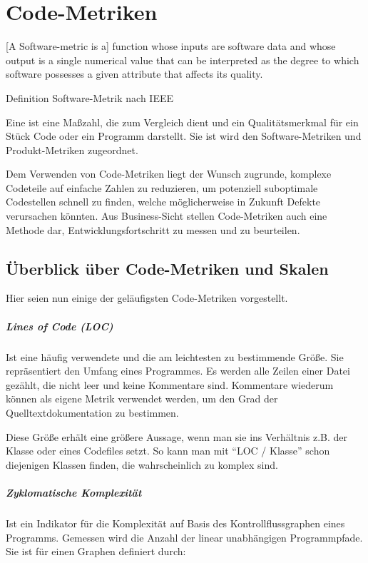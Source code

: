 \chapter{Code-Metriken}
\label{sec:metriken}
\epigraph{[A Software-metric is a] function whose inputs are software data and whose output is a single
numerical value that can be interpreted as the degree to which software possesses a given attribute that affects its quality.}{Definition Software-Metrik nach IEEE \citep{ieee_1998}}

Eine  ist eine Maßzahl, die zum Vergleich dient und ein Qualitätsmerkmal für ein Stück Code oder ein Programm darstellt. Sie ist wird den Software-Metriken und Produkt-Metriken zugeordnet.

Dem Verwenden von Code-Metriken liegt der Wunsch zugrunde, komplexe Codeteile auf einfache Zahlen zu reduzieren, um potenziell suboptimale Codestellen schnell zu finden, welche möglicherweise in Zukunft Defekte verursachen könnten. Aus Business-Sicht stellen Code-Metriken auch eine Methode dar, Entwicklungsfortschritt zu messen und zu beurteilen.
\section{Überblick über Code-Metriken und Skalen}
Hier seien nun einige der geläufigsten Code-Metriken vorgestellt.
\paragraph{Lines of Code (LOC)} Ist eine häufig verwendete und die am leichtesten zu bestimmende Größe. Sie repräsentiert den Umfang eines Programmes. Es werden alle Zeilen einer Datei gezählt, die nicht leer und keine Kommentare sind. Kommentare wiederum können als eigene Metrik verwendet werden, um den Grad der Quelltextdokumentation zu bestimmen.

Diese Größe erhält eine größere Aussage, wenn man sie ins Verhältnis z.B. der Klasse oder eines Codefiles setzt. So kann man mit "`LOC / Klasse"' schon diejenigen Klassen finden, die wahrscheinlich zu komplex sind. \\

\paragraph{Zyklomatische Komplexität} Ist ein Indikator für die Komplexität auf Basis des Kontrollflussgraphen eines Programms. Gemessen wird die Anzahl der linear unabhängigen Programmpfade. Sie ist für einen Graphen definiert durch:

